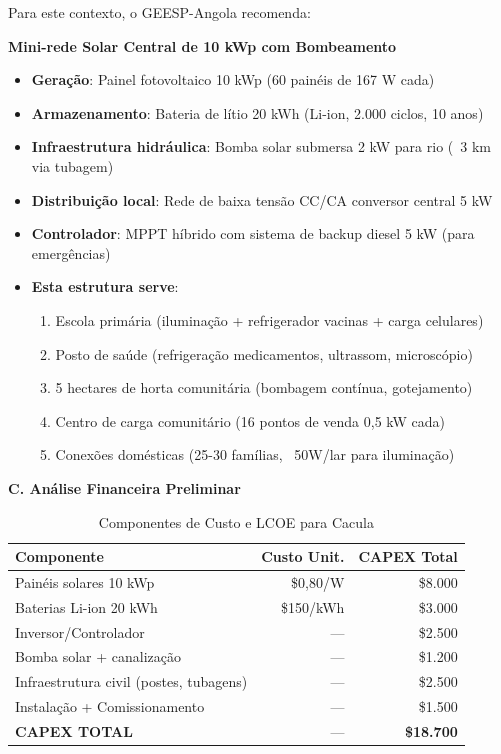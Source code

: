 \documentclass[12pt, a4paper]{article}
\begin{document}
Para este contexto, o GEESP-Angola recomenda:

\textbf{Mini-rede Solar Central de 10 kWp com Bombeamento}

\begin{itemize}
\item \textbf{Geração}: Painel fotovoltaico 10 kWp (60 painéis de 167 W cada)
\item \textbf{Armazenamento}: Bateria de lítio 20 kWh (Li-ion, 2.000 ciclos, 10 anos)
\item \textbf{Infraestrutura hidráulica}: Bomba solar submersa 2 kW para rio (~3 km via tubagem)
\item \textbf{Distribuição local}: Rede de baixa tensão CC/CA conversor central 5 kW
\item \textbf{Controlador}: MPPT híbrido com sistema de backup diesel 5 kW (para emergências)
\item \textbf{Esta estrutura serve}:
  \begin{enumerate}
  \item Escola primária (iluminação + refrigerador vacinas + carga celulares)
  \item Posto de saúde (refrigeração medicamentos, ultrassom, microscópio)
  \item 5 hectares de horta comunitária (bombagem contínua, gotejamento)
  \item Centro de carga comunitário (16 pontos de venda 0,5 kW cada)
  \item Conexões domésticas (25-30 famílias, ~50W/lar para iluminação)
  \end{enumerate}
\end{itemize}

\textbf{C. Análise Financeira Preliminar}

\begin{table}[H]
\centering
\caption{Componentes de Custo e LCOE para Cacula}
\label{tab:cacula_lcoe}
\small
\begin{tabular}{|l|r|r|}
\hline
\textbf{Componente} & \textbf{Custo Unit.} & \textbf{CAPEX Total} \\
\hline
Painéis solares 10 kWp & \$0,80/W & \$8.000 \\
Baterias Li-ion 20 kWh & \$150/kWh & \$3.000 \\
Inversor/Controlador & --- & \$2.500 \\
Bomba solar + canalização & --- & \$1.200 \\
Infraestrutura civil (postes, tubagens) & --- & \$2.500 \\
Instalação + Comissionamento & --- & \$1.500 \\
\hline
\textbf{CAPEX TOTAL} & --- & \textbf{\$18.700} \\
\hline
\end{tabular}
\end{table}
\end{document}
